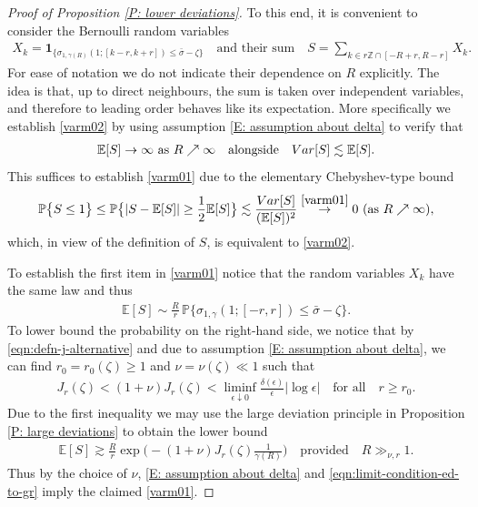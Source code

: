 \documentclass[10pt,a4paper]{amsart}
\begin{document}
\begin{proof}[Proof of Proposition \ref{P: lower deviations}]
	To this end, it is convenient to consider the Bernoulli random variables
	\begin{align*}
		X_{ k } = \boldsymbol{1}_{ \{ \sigma_{ 1 , \gamma(R) } ( 1 ; [ k - r , k + r ] ) \leq \bar\sigma - \zeta \} }
		\quad \text{and their sum} \quad
		S = \sum_{ k \in r \mathbb{Z} \cap [ - R + r , R - r  ] } X_k .
	\end{align*}
	For ease of notation we do not indicate their dependence on $ R $ explicitly. The idea is that, up to direct neighbours, the sum is taken over independent variables, and therefore to leading order behaves like its expectation. More specifically we establish \eqref{varm02} by using assumption \eqref{E: assumption about delta} to verify that
	\begin{align}\label{varm01}
		\mathbb{E} [ S ] \rightarrow \infty ~ \text{as} ~ R \nearrow \infty
		\quad \text{alongside} \quad
		{ \rm Var } [ S ] \lesssim \mathbb{E} [ S ].
	\end{align}
	This suffices to establish \eqref{varm01} due to the elementary Chebyshev-type bound
	\begin{align*}
		\mathbb{P} \big\{ S \leq 1 \big\} 
		\leq \mathbb{P} \big\{  | S - \mathbb{E} [ S ] | \geq \frac{ 1 }{ 2 } \mathbb{E} [ S ] \big\} 
		\lesssim \frac{ { \rm Var } [ S ] }{ ( \mathbb{E} [ S ] )^2 }
		\stackrel{ \eqref{varm01} }{ \rightarrow } 0 
		~ ( \text{as} ~ R \nearrow \infty ) ,
	\end{align*}
which, in view of the definition of $ S $, is equivalent to \eqref{varm02}.
        
To establish the first item in \eqref{varm01} notice that the random variables $ X_k $ have the same law and thus
	\begin{align*}
		\mathbb{E} [ S ]
		\sim \frac{ R }{ r } \, \mathbb{P} \big\{ \sigma_{ 1 , \gamma } ( 1 ; [ - r , r ] ) \leq \bar\sigma - \zeta \big\}   .
	\end{align*}
	To lower bound the probability on the right-hand side, we notice that by \eqref{eqn:defn-j-alternative} and due to assumption \eqref{E: assumption about delta}, we can find $ r_0 = r_0 ( \zeta ) \geq 1 $ and $ \nu = \nu ( \zeta ) \ll 1 $ such that
	\begin{align*}
		J_r ( \zeta ) 
		< ( 1 + \nu )  J_r ( \zeta ) < \liminf_{ \epsilon \downarrow 0} \frac{ \delta(\epsilon) }{ \epsilon } | \log \epsilon |
		\quad \text{for all} \quad
		r \geq r_0 .
	\end{align*}
	Due to the first inequality we may use the large deviation principle in Proposition \ref{P: large deviations} to obtain the lower bound
	\begin{align*}
		\mathbb{E} [ S ] \gtrsim \frac{ R }{ r } \exp \Big( - ( 1 + \nu )  J_{ r } ( \zeta ) \frac{ 1 }{ \gamma(R) } \Big) 
		\quad \text{provided} \quad
		R \gg_{ \nu, r } 1 .
	\end{align*}
	Thus by the choice of $ \nu $, \eqref{E: assumption about delta} and \eqref{eqn:limit-condition-ed-to-gr} imply the claimed \eqref{varm01}.
	

\end{proof}
\end{document}
